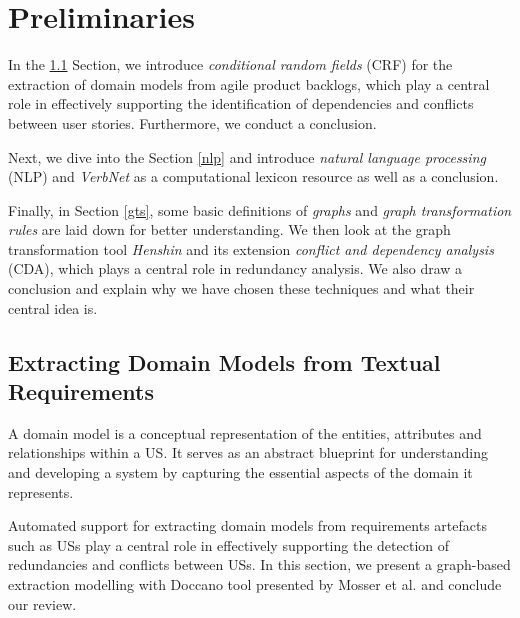 \section{Preliminaries}\label{preliminaries}

In the \ref{dmodel} Section, we introduce \emph{conditional random fields} (CRF) for the extraction of domain models from agile product backlogs, which play a central role in effectively supporting the identification of dependencies and conflicts between user stories. Furthermore, we conduct a conclusion.

Next, we dive into the Section \ref{nlp} and introduce \emph{natural language processing} (NLP) and \emph{VerbNet} as a computational lexicon resource as well as a conclusion.

Finally, in Section \ref{gts}, some basic definitions of \emph{graphs} and \emph{graph transformation rules} are laid down for better understanding. We then look at the graph transformation tool \emph{Henshin} and its extension \emph{conflict and dependency analysis} (CDA), which plays a central role in redundancy analysis. We also draw a conclusion and explain why we have chosen these techniques and what their central idea is.

\subsection{Extracting Domain Models from Textual Requirements}\label{dmodel}
A domain model is a conceptual representation of the entities, attributes and relationships within a US. It serves as an abstract blueprint for understanding and developing a system by capturing the essential aspects of the domain it represents.

Automated support for extracting domain models from requirements artefacts such as USs play a central role in effectively supporting the detection of redundancies and conflicts between USs. In this section, we present a graph-based extraction modelling with Doccano tool presented by Mosser et al. and conclude our review.

